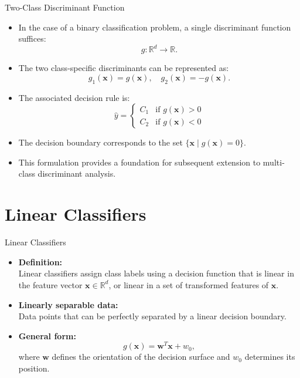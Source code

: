 \documentclass[serif, aspectratio=169]{beamer}
\begin{document}
\begin{frame}{Two-Class Discriminant Function}
    \begin{itemize}
        \item In the case of a binary classification problem, a single discriminant function suffices:
        \[
            g : \mathbb{R}^d \rightarrow \mathbb{R}.
        \]
        \item The two class-specific discriminants can be represented as:
        \[
            g_1(\mathbf{x}) = g(\mathbf{x}), \quad g_2(\mathbf{x}) = -g(\mathbf{x}).
        \]
        \item The associated decision rule is:
        \[
            \hat{y} =
            \begin{cases}
                C_1 & \text{if } g(\mathbf{x}) > 0 \\
                C_2 & \text{if } g(\mathbf{x}) < 0
            \end{cases}
        \]
        \item The decision boundary corresponds to the set $\{\mathbf{x} \mid g(\mathbf{x}) = 0\}$.
        \item This formulation provides a foundation for subsequent extension to multi-class discriminant analysis.
    \end{itemize}
\end{frame}



\section{Linear Classifiers}

\begin{frame}{Linear Classifiers}
    \begin{itemize}\itemsep1.5em
        \item \justifying \textbf{Definition:}\\
        Linear classifiers assign class labels using a decision function that is linear in the feature vector $\mathbf{x} \in \mathbb{R}^d$, or linear in a set of transformed features of $\mathbf{x}$.
        \item \justifying \textbf{Linearly separable data:}\\
        Data points that can be perfectly separated by a linear decision boundary.
        \item \textbf{General form:}
        \[
            g(\mathbf{x}) = \mathbf{w}^T \mathbf{x} + w_0,
        \]
        where $\mathbf{w}$ defines the orientation of the decision surface and $w_0$ determines its position.
    \end{itemize}
\end{frame}
\end{document}
